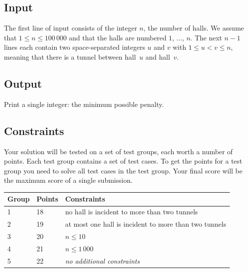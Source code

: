 \subsection*{Input}

The first line of input consists of the integer $n$, the number of halls.
We assume that $1\leq n\leq 100\,000$ and that the halls are numbered $1$, $\ldots$, $n$.
The next $n-1$ lines each contain two space-separated integers $u$ and $v$ with $1\leq u < v \leq n$, meaning that there is a tunnel between hall~$u$ and hall~$v$.

\subsection*{Output}

Print a single integer: the minimum possible penalty.

\subsection*{Constraints}

Your solution will be tested on a set of test groups, each worth a number of points.
Each test group contains a set of test cases.
To get the points for a test group you need to solve all test cases in the test group.
Your final score will be the maximum score of a single submission.

\medskip
\begin{tabular}{lll}
Group & Points & Constraints \\\hline
1 & 18 & no hall is incident to more than two tunnels\\
2 & 19 & at most one hall is incident to more than two tunnels\\
3 & 20 & $n\leq 10$\\
4 & 21 & $n\leq 1\,000$\\
5 & 22 & \emph{no additional constraints}
\end{tabular}
